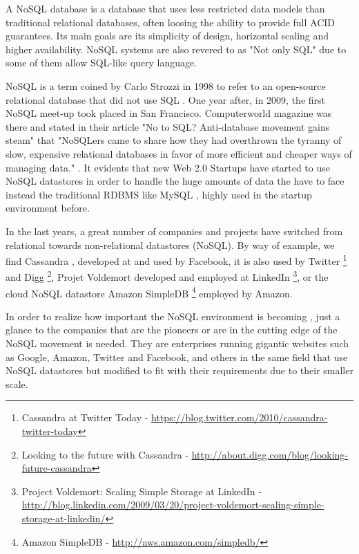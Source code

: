 \par
A NoSQL database is a database that uses less restricted data models than traditional relational databases, often loosing the ability to provide full ACID guarantees. Its main goals are its simplicity of design, horizontal scaling and higher availability. NoSQL systems are also revered to as "Not only SQL" due to some of them allow SQL-like query language.
\par
NoSQL is a term coined by Carlo Strozzi in 1998 to refer to an open-source relational database that did not use SQL \cite{Strozzi}. One year after, in 2009, the first NoSQL meet-up took placed in San Francisco. Computerworld magazine was there and stated in their article "No to SQL? Anti-database movement gains steam" that "NoSQLers came to share how they had overthrown the tyranny of slow, expensive relational databases in favor of more efficient and cheaper ways of managing data." \cite{ComputerworldNoSQL}. It evidents that new Web 2.0 Startups have started to use NoSQL datastores in order to handle the huge amounts of data the have to face instead the traditional RDBMS like MySQL \nocite{MySQL}, highly used in the startup environment before.
\par
In the last years, a great number of companies and projects have switched from relational towards non-relational datastores (NoSQL). By way of example, we find Cassandra \cite{ApacheCassandra}, developed at and used by Facebook, it is also used by Twitter \footnote{Cassandra at Twitter Today - \url{https://blog.twitter.com/2010/cassandra-twitter-today}} and Digg \footnote{Looking to the future with Cassandra - \url{http://about.digg.com/blog/looking-future-cassandra}}, Projet Voldemort developed and employed at LinkedIn \footnote{Project Voldemort: Scaling Simple Storage at LinkedIn - \url{http://blog.linkedin.com/2009/03/20/project-voldemort-scaling-simple-storage-at-linkedin/}}, or the cloud NoSQL datastore Amazon SimpleDB \footnote{Amazon SimpleDB -
\url{http://aws.amazon.com/simpledb/}} employed by Amazon.
\par
In order to realize how important the NoSQL environment is becoming , just a glance to the companies that are the pioneers or are in the cutting edge of the NoSQL movement is needed. They are enterprises running gigantic websites such as Google, Amazon, Twitter and Facebook, and others in the same field that use NoSQL datastores but modified to fit with their requirements due to their smaller scale.
\par




